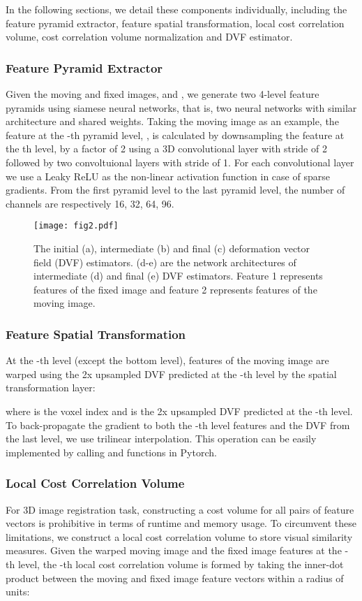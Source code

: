 \documentclass[runningheads]{llncs}
\begin{document}
In the following sections, we detail these components individually, including the feature pyramid extractor, feature spatial transformation, local cost correlation volume, cost correlation volume normalization and DVF estimator. 

\subsubsection{Feature Pyramid Extractor}
Given the moving  and  fixed images,  and , we generate two 4-level feature pyramids using siamese neural networks, that is, two neural networks with similar architecture and shared weights. Taking the moving image as an example, the feature at the -th pyramid level, , is calculated by downsampling the feature at the th level,  by a factor of 2 using a 3D convolutional layer with stride of 2 followed by two convoltuional layers with stride of 1. For each convolutional layer we use a Leaky ReLU as the non-linear activation function in case of sparse gradients. From the first pyramid level to the last pyramid level, the number of channels are respectively 16, 32, 64, 96.

\begin{figure}[t]
\texttt{[image: fig2.pdf]}
\caption{The initial (a), intermediate (b) and final (c) deformation vector field (DVF) estimators. (d-e) are the network architectures of intermediate (d) and final (e) DVF estimators. Feature 1 represents features of the fixed image and feature 2 represents features of the moving image.} \label{fig2}
\end{figure}

\subsubsection{Feature Spatial Transformation}
At the -th level (except the bottom level), features of the moving image are warped using the 2x upsampled DVF predicted at the -th level by the spatial transformation layer\cite{jaderbergSpatialTransformerNetworks2016}:

where  is the voxel index and  is the 2x upsampled DVF predicted at the -th level. To back-propagate the gradient to both the -th level features and the DVF from the last level, we use trilinear interpolation. This operation can be easily implemented by calling  and  functions in Pytorch.

\subsubsection{Local Cost Correlation Volume}
For 3D image registration task, constructing a cost volume for all pairs of feature vectors is prohibitive in terms of runtime and memory usage. To circumvent these limitations, we construct a local cost correlation volume to store visual similarity measures. Given the warped moving image and the fixed image features at the -th level, the -th local cost correlation volume is formed by taking the inner-dot product between the moving and fixed image feature vectors within a radius of  units:
\end{document}
